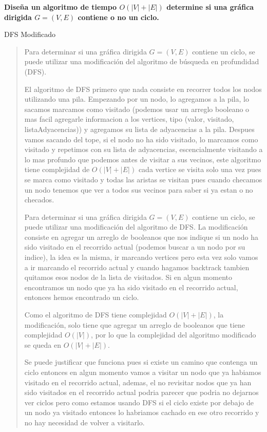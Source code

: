 \textbf{
    Diseña un algoritmo de tiempo $O(|V|+|E|)$ determine si una gráfica dirigida 
    $G = (V,E)$ contiene o no un ciclo.
}\vspace{.2cm}

\textcolor{bibi}{DFS Modificado}
\begin{quote}
    Para determinar si una gráfica dirigida $G = (V,E)$ contiene un ciclo, se 
    puede utilizar una modificación del algoritmo de búsqueda en profundidad 
    (DFS). \vspace{.2cm}

    El algoritmo de DFS primero que nada consiste en recorrer todos los nodos 
    utilizando una pila. Empezando por un nodo, lo agregamos a la pila, lo sacamos
    marcamos como visitado (podemos usar un arreglo booleano o mas facil agregarle informacion a los vertices, tipo (valor, visitado, listaAdyacencias)) y agregamos su lista de adyacencias a la pila. Despues vamos sacando del tope, si el nodo no ha sido visitado, lo marcamos como visitado y repetimos con su lista de adyacencias, escencialmente visitando a lo mas profundo que podemos antes de visitar a sus vecinos, este algoritmo tiene complejidad de $O(|V|+|E|)$ cada vertice se visita solo una vez pues se marca como visitado y todas las aristas se visitan pues cuando checamos un nodo tenemos que ver a todos sus vecinos para saber si ya estan o no checados. \vspace{.2cm}

    Para determinar si una gráfica dirigida $G = (V,E)$ contiene un ciclo, se
    puede utilizar una modificación del algoritmo de DFS. La modificación consiste
    en agregar un arreglo de booleanos que nos indique si un nodo ha sido visitado
    en el recorrido actual (podemos buscar a un nodo por su indice), la idea es la misma, ir marcando vertices pero esta vez solo vamos a ir marcando el recorrido actual y cuando hagamos backtrack tambien quitamos esos nodos de la lista de visitados. Si en algun momento encontramos un nodo que ya ha sido visitado en el recorrido actual, entonces hemos encontrado un ciclo. \vspace{.2cm}

    Como el algoritmo de DFS tiene complejidad $O(|V|+|E|)$, la modificación, solo tiene que agregar un arreglo de booleanos que tiene complejidad $O(|V|)$, por lo que la complejidad del algoritmo modificado se queda en $O(|V|+|E|)$. \vspace{.2cm}

    Se puede justificar que funciona pues si existe un camino que contenga un ciclo entonces en algun momento vamos a visitar un nodo que ya habiamos visitado en el recorrido actual, ademas, el no revisitar nodos que ya han sido visitados en el recorrido actual podria parecer que podria no dejarnos ver ciclos pero como estamos usando DFS si el ciclo existe por debajo de un nodo ya visitado entonces lo habriamos cachado en ese otro recorrido y no hay necesidad de volver a visitarlo. 
\end{quote}